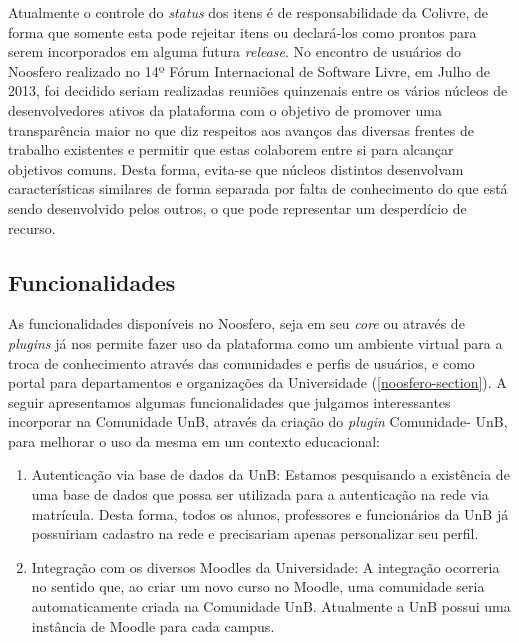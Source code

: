 Atualmente o controle do \textit{status} dos itens é de responsabilidade da
Colivre, de forma que somente esta pode rejeitar itens ou declará-los como
prontos para serem incorporados em alguma futura \textit{release}.
%
No encontro de usuários do Noosfero realizado no 14º Fórum Internacional de
Software Livre, em Julho de 2013, foi decidido seriam realizadas
reuniões quinzenais entre os vários núcleos de desenvolvedores ativos da
plataforma com o objetivo de promover uma transparência maior no que diz
respeitos aos avanços das diversas frentes de trabalho existentes e permitir
que estas colaborem entre si para alcançar objetivos comuns. Desta forma,
evita-se que núcleos distintos desenvolvam características similares de forma
separada por falta de conhecimento do que está sendo desenvolvido pelos outros,
o que pode representar um desperdício de recurso.

\subsection{Funcionalidades}

As funcionalidades disponíveis no Noosfero, seja em seu \textit{core}
ou através de \textit{plugins} já nos permite fazer uso da plataforma como
um ambiente virtual para a troca de conhecimento através das comunidades e
perfis de usuários, e como portal para departamentos e organizações da
Universidade (\ref{noosfero-section}).
%
A seguir apresentamos algumas funcionalidades que julgamos interessantes
incorporar na Comunidade UnB, através da criação do \textit{plugin} Comunidade-
UnB, para melhorar o uso da mesma em um contexto educacional:

	\begin{enumerate}
		\item Autenticação via base de dados da UnB:
		Estamos pesquisando a existência de uma base de dados que possa
		ser utilizada para a autenticação na rede via matrícula. Desta forma,
		todos os alunos, professores e funcionários da UnB já possuiriam
		cadastro na rede e precisariam apenas personalizar seu perfil.
		\item Integração com os diversos Moodles da Universidade:
		A integração ocorreria no sentido que, ao criar um novo curso no
		Moodle, uma comunidade seria automaticamente criada na Comunidade
		UnB. Atualmente a UnB possui uma instância de Moodle para cada
		campus.
	\end{enumerate}

